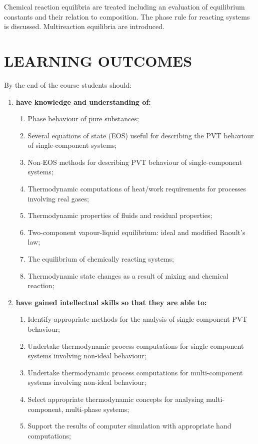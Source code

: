 \documentclass[12pts,a4paper,amsmath,amssymb,floatfix]{article}%
\begin{document}
Chemical reaction equilibria are treated including an evaluation of equilibrium constants and their relation to composition. The phase rule for reacting systems is discussed. Multireaction equilibria are introduced.


\section{LEARNING OUTCOMES}
By the end of the course students should:
\begin{enumerate}[{\bf A.}]
\item {\bf have knowledge and understanding of:}
  \begin{enumerate}
    \item Phase behaviour of pure substances;
    \item Several equations of state (EOS) useful for describing the PVT behaviour of single-component systems;
    \item Non-EOS methods for describing PVT behaviour of single-component systems;
    \item Thermodynamic computations of heat/work requirements for processes involving real gases;
    \item Thermodynamic properties of fluids and residual properties;
    \item Two-component vapour-liquid equilibrium: ideal and modified Raoult's law;
    \item The equilibrium of chemically reacting systems;
    \item Thermodynamic state changes as a result of mixing and chemical reaction;
  \end{enumerate}
\item {\bf have gained intellectual skills so that they are able to:}
  \begin{enumerate}
    \item Identify appropriate methods for the analysis of single component PVT behaviour;
    \item Undertake thermodynamic process computations for single component systems involving non-ideal behaviour;
    \item Undertake thermodynamic process computations for multi-component systems involving non-ideal behaviour;
    \item Select appropriate thermodynamic concepts for analysing multi-component, multi-phase systems;
    \item Support the results of computer simulation with appropriate hand computations;

\end{enumerate}
\end{enumerate}
\end{document}

